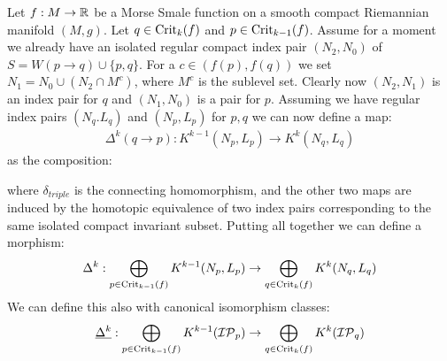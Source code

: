 \begin{example}
	Let $f:M\to \mathbb{R}$ be a Morse Smale function on a smooth compact Riemannian manifold $(M,g)$. Let $q\in \mathrm{Crit}_k(f)$ and $p\in \mathrm{Crit}_{k-1}(f)$. Assume for a moment we already have an isolated regular compact index pair $(N_2,N_0)$ of $S=W(p\to q)\cup\{p,q\}$. 
	For a $c\in (f(p),f(q))$ we set $N_1=N_0\cup (N_2 \cap M^c)$, where $M^c$ is the sublevel set. Clearly now $(N_2,N_1)$ is an index pair for $q$ and $(N_1,N_0)$ is a pair for $p$. Assuming we have regular index pairs $(N_q.L_q)$ and $(N_p,L_p)$ for $p,q$ we can now define a map:
	\begin{align*}
		\Delta^k(q \to p):K^{k-1}(N_p,L_p) \to  K^k(N_q,L_q) 
	\end{align*} as the composition:
	\begin{center}
	\end{center} where $\delta_{triple}$ is the connecting homomorphism, and the other two maps are induced by the homotopic equivalence of two index pairs corresponding to the same isolated compact invariant subset. Putting all together we can define a morphism:
	\begin{align}\label{equation: definition of boundary operator for filtrations}
		\Delta^k:\bigoplus_{p\in \mathrm{Crit}_{k-1}(f)}K^{k-1}(N_p,L_p) \to \bigoplus_{q\in \mathrm{Crit}_k(f)}K^k(N_q,L_q)
	\end{align}
	We can define this also with canonical isomorphism classes:
	\begin{equation*}
		\underline{\Delta^k}:\bigoplus\limits_{p\in \mathrm{Crit}_{k-1}(f)}K^{k-1}(\mathcal{IP}_p)\to \bigoplus\limits_{q\in \mathrm{Crit}_{k}(f)}K^{k}(\mathcal{IP}_q)
	\end{equation*} 
\end{example}







